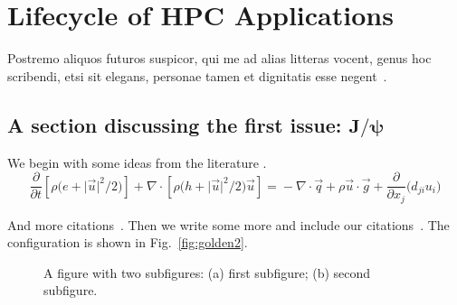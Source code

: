 

\chapter{Lifecycle of HPC Applications}

\lipsum[1-2] Postremo aliquos futuros suspicor, qui me ad alias litteras vocent, genus hoc scribendi, etsi sit elegans, personae tamen et dignitatis esse negent~\cite{DKE1969,ww1920,kirk2288a,churchill1948,gibbs1863}.

\section[A section discussing the first issue: \(J/\psi\)]{A section discussing the first issue: \ifpdftex\(\bm{J}/\bm{\psi}\)\fi}


We begin with some ideas from the literature \cite{Fong2015,sharpe1}. 
\begin{equation}
\frac{\partial}{\partial t}\left[\rho\bigl(e + \lvert\vec{u}\rvert^2\big/2\bigr)\right]  + \nabla\cdot\left[\rho\bigl(h + \lvert\vec{u}\rvert^2\big/2 \bigr)\vec{u}\right]
 ={}-\nabla \cdot \vec{q} +  \rho \vec{u}\cdot\vec{g}+ \frac{\partial}{\partial x_j}\bigl(d_{ji}u_i\bigr)
\end{equation}
 \lipsum[3]

\lipsum[4] And more citations~\cite{sharpe1,GSL}.  Then we write some more and include our citations~\cite{Swaminathan2017IDABRO,dlmf,amsmath}. The configuration is shown in Fig.~\ref{fig:golden2}.

\begin{figure}[t]
\begin{subfigure}[c]{0.495\textwidth}
%
\subcaption{\label{fig:golden}}
\end{subfigure}
\begin{subfigure}[c]{0.495\textwidth}
%
\subcaption{\label{fig:golden2}}%
\end{subfigure}%
\caption{A figure with two subfigures: (a) first subfigure; (b) second subfigure.\label{fig:4}}
\end{figure}


